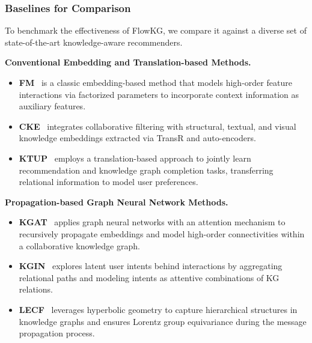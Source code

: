 \subsubsection{\textbf{Baselines for Comparison}}
To benchmark the effectiveness of FlowKG, we compare it against a diverse set of state-of-the-art knowledge-aware recommenders.

\noindent\textbf{Conventional Embedding and Translation-based Methods.}
\begin{itemize}
	\item \textbf{FM}~\cite{rendle2011fast} is a classic embedding-based method that models high-order feature interactions via factorized parameters to incorporate context information as auxiliary features.
	\item \textbf{CKE}~\cite{zhang2016collaborative} integrates collaborative filtering with structural, textual, and visual knowledge embeddings extracted via TransR and auto-encoders.
	\item \textbf{KTUP}~\cite{cao2019unifying} employs a translation-based approach to jointly learn recommendation and knowledge graph completion tasks, transferring relational information to model user preferences.
\end{itemize}

\noindent\textbf{Propagation-based Graph Neural Network Methods.}
\begin{itemize}
	\item \textbf{KGAT}~\cite{wang2019kgat} applies graph neural networks with an attention mechanism to recursively propagate embeddings and model high-order connectivities within a collaborative knowledge graph.
	\item \textbf{KGIN}~\cite{wang2021learning} explores latent user intents behind interactions by aggregating relational paths and modeling intents as attentive combinations of KG relations.
	\item \textbf{LECF}~\cite{huang2024lorentz} leverages hyperbolic geometry to capture hierarchical structures in knowledge graphs and ensures Lorentz group equivariance during the message propagation process.
\end{itemize}


